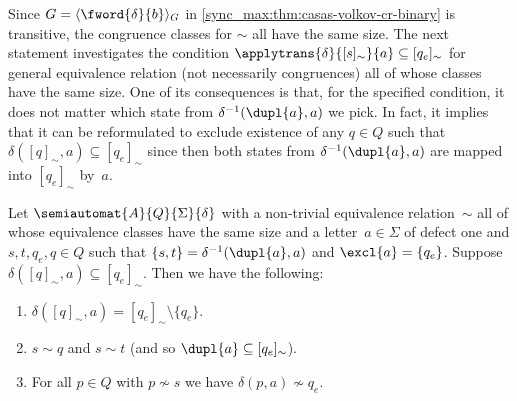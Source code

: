 Since $G = \langle \fword{\delta}{b} \rangle_G$ in \cref{sync_max:thm:casas-volkov-cr-binary} 
is transitive, the congruence classes for $\sim$ all have the same size. The next
statement investigates the condition $\applytrans{\delta}{[s]_{\sim}}{a} \subseteq [q_e]_{\sim}$
for general equivalence relation (not necessarily congruences) all of whose
classes have the same size. One of its consequences is that, for the specified condition, it does
not matter which state from $\delta^{-1}(\dupl{a}, a)$ we pick. In fact,
it implies that it can be reformulated to exclude existence of any $q \in Q$
such that $\delta([q]_{\sim}, a) \subseteq [q_e]_{\sim}$ since then
both states from $\delta^{-1}(\dupl{a}, a)$ are mapped into $[q_e]_{\sim}$ by~$a$.

\begin{proposition} \label{syncmax:prop:equivalence-defect-one}
	Let $\semiautomat{A}{Q}{\Sigma}{\delta}$
	with a non-trivial equivalence relation~$\sim$
	all of whose equivalence classes have the same size
	and a letter~$a \in \Sigma$ of defect one
	and $s,t, q_e, q \in Q$ such that $\{s,t\} = \delta^{-1}(\dupl{a}, a)$
	and $\excl{a} = \{q_e\}$.
	Suppose $\delta([q]_{\sim}, a) \subseteq [q_e]_{\sim}$.
	Then we have the following:	
	\begin{enumerate}
		\item \label{syncmax:prop:equivalence-defect-one:1} $\delta([q]_{\sim}, a) = [q_e]_{\sim} \setminus \{q_e\}$.
		
		\item \label{syncmax:prop:equivalence-defect-one:2} $s \sim q$ and $s \sim t$ 
		(and so $\dupl{a} \subseteq [q_e]_{\sim}$).
		
		\item \label{syncmax:prop:equivalence-defect-one:3} For all 
		$p \in Q$ with $p \not\sim s$ we have $\delta(p, a) \not\sim q_e$.
	\end{enumerate}
\end{proposition}
